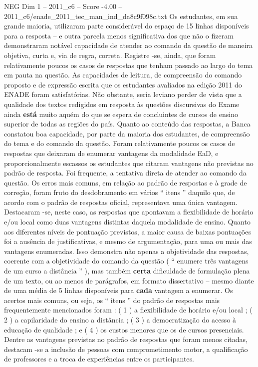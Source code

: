 \begin{textsample}{NEG Dim 1 – 2011\_c6 – Score -4.00 – 2011\_c6/enade\_2011\_tec\_man\_ind\_da8c9f098c.txt}
Os estudantes, em sua grande maioria, utilizaram parte considerável do espaço de 15 linhas disponíveis para a resposta – e outra parcela menos significativa dos que não o fizeram demonstraram notável capacidade de atender ao comando da questão de maneira objetiva, curta e, via de regra, correta.
Registre -se, ainda, que foram relativamente poucos os casos de respostas que tenham passado ao largo do tema em pauta na questão.
As capacidades de leitura, de compreensão do comando proposto e de expressão escrita que os estudantes avaliados na edição 2011 do ENADE foram satisfatórias.
Não obstante, seria leviano perder de vista que a qualidade dos textos redigidos em resposta às questões discursivas do Exame ainda \textbf{está} muito aquém do que se espera de concluintes de cursos de ensino superior de todas as regiões do país.
Quanto ao conteúdo das respostas, a Banca constatou boa capacidade, por parte da maioria dos estudantes, de compreensão do tema e do comando da questão.
Foram relativamente poucos os casos de respostas que deixaram de enumerar vantagens da modalidade EaD, e proporcionalmente escassos os estudantes que citaram vantagens não previstas no padrão de resposta.
Foi frequente, a tentativa direta de atender ao comando da questão.
Os erros mais comuns, em relação ao padrão de respostas e à grade de correção, foram fruto do desdobramento em vários “ itens ” daquilo que, de acordo com o padrão de respostas oficial, representava uma única vantagem.
Destacaram -se, neste caso, as respostas que apontavam a flexibilidade de horário e/ou local como duas vantagens distintas daquela modalidade de ensino.
Quanto aos diferentes níveis de pontuação previstos, a maior causa de baixas pontuações foi a ausência de justificativas, e mesmo de argumentação, para uma ou mais das vantagens enumeradas.
Isso demonstra não apenas a objetividade das respostas, coerente com a objetividade do comando da questão ( “ enumere três vantagens de um curso a distância ” ), mas também \textbf{certa} dificuldade de formulação plena de um texto, ou ao menos de parágrafos, em formato dissertativo – mesmo diante de uma média de 5 linhas disponíveis para \textbf{cada} vantagem a enumerar.
Os acertos mais comuns, ou seja, os “ itens ” do padrão de respostas mais frequentemente mencionados foram : ( 1 ) a flexibilidade de horário e/ou local ; ( 2 ) a capilaridade do ensino a distância ; ( 3 ) a democratização do acesso à educação de qualidade ; e ( 4 ) os custos menores que os de cursos presenciais.
Dentre as vantagens previstas no padrão de respostas que foram menos citadas, destacam -se a inclusão de pessoas com comprometimento motor, a qualificação de professores e a troca de experiências entre os participantes.

\end{textsample}
